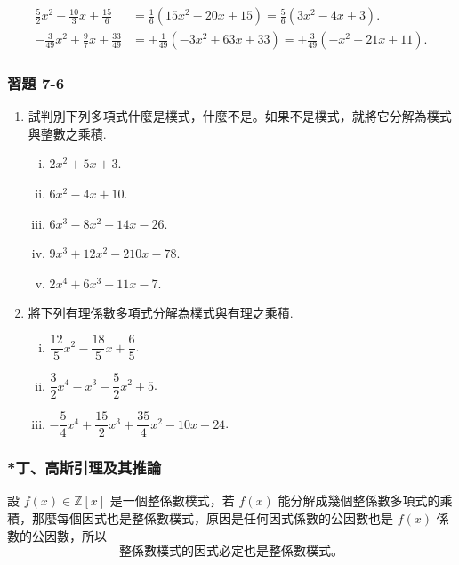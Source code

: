 \begin{example}\label{ex:7-2-12}
\begin{align*}
  \frac{5}{2}x^2-\frac{10}{3}x+\frac{15}{6} &= \frac{1}{6}(15x^2-20x+15) = \frac{5}{6}(3x^2-4x+3). \\
  -\frac{3}{49}x^2+\frac{9}{7}x+\frac{33}{49} &= +\frac{1}{49}(-3x^2+63x+33) = +\frac{3}{49}(-x^2+21x+11).
\end{align*}
\end{example}

\subsubsection*{習題 7-6}\label{sec:ex7-6}

\begin{enumerate}[1.]
  \item 試判別下列多項式什麼是樸式，什麼不是。如果不是樸式，就將它分解為樸式與整數之乘積.
  \begin{enumerate}[(i)]
    \item $2x^2+5x+3$.
    \item $6x^2-4x+10$.
    \item $6x^3-8x^2+14x-26$.
    \item $9x^3+12x^2-210x-78$.
    \item $2x^4+6x^3-11x-7$.
  \end{enumerate}

  \item 將下列有理係數多項式分解為樸式與有理之乘積.
  \begin{enumerate}[(i)]
    \item $\dfrac{12}{5}x^2-\dfrac{18}{5}x+\dfrac{6}{5}$.
    \item $\dfrac{3}{2}x^4-x^3-\dfrac{5}{2}x^2+5$.
    \item $-\dfrac{5}{4}x^4+\dfrac{15}{2}x^3+\dfrac{35}{4}x^2-10x+24$.
  \end{enumerate}
\end{enumerate}

\subsubsection*{*丁、高斯引理及其推論}\label{subsec:7-2-d}

設 $f(x) \in \mathbb{Z}[x]$ 是一個整係數樸式，若 $f(x)$ 能分解成幾個整係數多項式的乘積，那麼每個因式也是整係數樸式，原因是任何因式係數的公因數也是 $f(x)$ 係數的公因數，所以
\begin{equation*}
  \text{整係數樸式的因式必定也是整係數樸式。}
\end{equation*}

